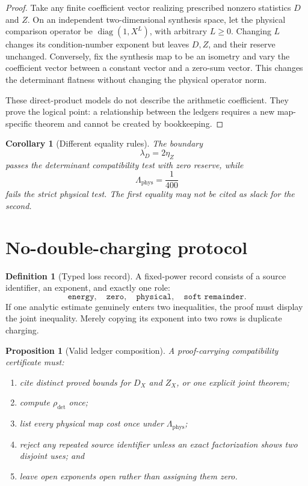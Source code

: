 \documentclass[11pt,a4paper]{article}
\newtheorem{proposition}[theorem]{Proposition}
\newtheorem{corollary}[theorem]{Corollary}
\theoremstyle{definition}
\newtheorem{definition}[theorem]{Definition}
\theoremstyle{remark}
\newcommand{\Lam}{\Lambda_{\mathrm{phys}}}
\begin{document}
\begin{proof}
Take any finite coefficient vector realizing prescribed nonzero
  statistics \(D\) and \(Z\).  On an independent two-dimensional
  synthesis space, let the physical comparison operator be
  \(\operatorname{diag}(1,X^L)\), with arbitrary \(L\ge0\).
 Changing \(L\) changes its condition-number exponent but leaves \(D,Z\), and
their reserve unchanged.  Conversely, fix the synthesis map to be
an isometry and vary the coefficient vector between a constant
vector and a zero-sum vector.  This changes the determinant
flatness without changing the physical operator norm.

These direct-product models do not describe the arithmetic
coefficient.  They prove the logical point: a relationship between
the ledgers requires a new map-specific theorem and cannot be
created by bookkeeping.
\end{proof}

\begin{corollary}[Different equality rules]
The boundary
\[
 \lambda_D=2\eta_Z
\]
passes the determinant compatibility test with zero reserve, while
\[
 \Lam=\frac1{400}
\]
fails the strict physical test.  The first equality may not be cited
as slack for the second.
\end{corollary}

\section{No-double-charging protocol}

\begin{definition}[Typed loss record]
A fixed-power record consists of a source identifier, an exponent,
and exactly one role:
\[
 \texttt{energy},\quad
 \texttt{zero},\quad
 \texttt{physical},\quad
 \texttt{soft remainder}.
\]
If one analytic estimate genuinely enters two inequalities, the
proof must display the joint inequality.  Merely copying its
exponent into two rows is duplicate charging.
\end{definition}

\begin{proposition}[Valid ledger composition]
\label{prop:ledger}
A proof-carrying compatibility certificate must:
\begin{enumerate}[label=(\roman*),leftmargin=2.2em]
\item cite distinct proved bounds for \(D_X\) and \(Z_X\), or one
explicit joint theorem;
\item compute \(\rho_{\mathrm{det}}\) once;
\item list every physical map cost once under \(\Lam\);
\item reject any repeated source identifier unless an exact
factorization shows two disjoint uses; and
\item leave open exponents open rather than assigning them zero.
\end{enumerate}
\end{proposition}
\end{document}
